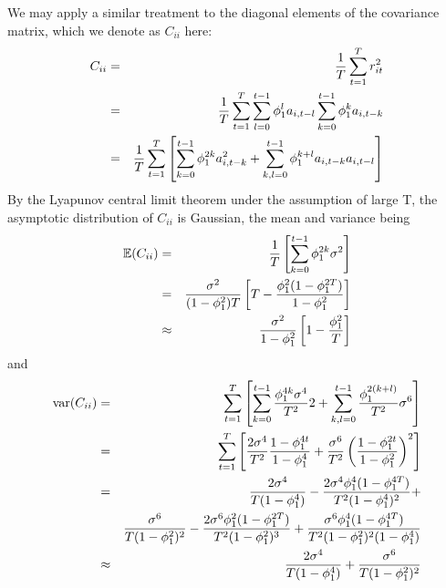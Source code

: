 
We may apply a similar treatment to the diagonal elements of the
covariance matrix, which we denote as $C_{ii}$ here:
\begin{eqnarray*}
  C_{ii} &=& {1 \over T} \sum_{t=1}^T r^2_{it} \\
  &=& {1 \over T} \sum_{t=1}^T \sum_{l=0}^{t-1}\phi_1^l a_{i, t-l}
  \sum_{k=0}^{t-1}\phi_1^k a_{i, t-k} \\
  &=& {1 \over T} \sum_{t=1}^T \left[
    \sum_{k=0}^{t-1} \phi_1^{2k} a^2_{i, t-k} +
    \sum_{k,l = 0}^{t-1} \phi_1^{k+l} a_{i, t-k} a_{i, t-l}
  \right]
\end{eqnarray*}
By the Lyapunov central limit theorem under the assumption of large T,
the asymptotic distribution of $C_{ii}$ is Gaussian, the mean and
variance being
\begin{eqnarray}
  \mathbb{E}(C_{ii}) &=& {1 \over T}\left[
    \sum_{k=0}^{t-1} \phi_1^{2k} \sigma^2
  \right] \nonumber \\
  &=& {\sigma^2 \over (1 - \phi_1^2) T} \left[
    T - {\phi_1^2 (1 - \phi_1^{2T}) \over 1 - \phi_1^2}
  \right] \nonumber \\
  & \approx & {\sigma^2 \over 1 - \phi_1^2} \left[
    1 - {\phi_1^2 \over T}
  \right] \label{eq:gaussian_cii_mean}
\end{eqnarray}
and
\begin{eqnarray}
  \text{var}(C_{ii}) &=& \sum_{t=1}^T \left[
    \sum_{k=0}^{t-1} {\phi_1^{4k} \sigma^4 \over T^2} 2 +
    \sum_{k,l=0}^{t-1} {\phi_1^{2(k+l)} \over T^2} \sigma^6
  \right] \nonumber \\
  &=& \sum_{t=1}^T \left[
    {2 \sigma^4 \over T^2} {1 - \phi_1^{4t} \over 1 - \phi_1^4} +
    {\sigma^6 \over T^2} \left(
      {1 - \phi_1^{2t} \over 1- \phi_1^2}
    \right)^2 \right] \nonumber \\
  &=& {2 \sigma^4 \over T (1 - \phi_1^4)} -
  {2 \sigma^4 \phi_1^4 (1 - \phi_1^{4T}) \over T^2(1 - \phi_1^4)^2} +
  \nonumber \\
  && {\sigma^6 \over T (1 -\phi_1^2)^2} -
  {2 \sigma^6 \phi_1^2 (1 - \phi_1^{2T}) \over T^2 (1 - \phi_1^2)^3} +
  {\sigma^6 \phi_1^4 (1 - \phi_1^{4T}) \over T^2 (1 - \phi_1^2)^2 (1 -
    \phi_1^4)} \nonumber \\
  &\approx& {2 \sigma^4 \over T (1 - \phi_1^4)} + {\sigma^6 \over T (1
    -\phi_1^2)^2} \label{eq:gaussian_cii_variance}
\end{eqnarray}
